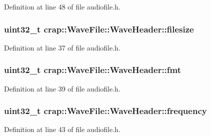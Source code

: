 Definition at line 48 of file audiofile.\+h.

\hypertarget{structcrap_1_1_wave_file_1_1_wave_header_a66ee60f117774b2a2c89b3b5b5d7881f}{}
\subsubsection[{filesize}]{\setlength{\rightskip}{0pt plus 5cm}uint32\+\_\+t crap\+::\+Wave\+File\+::\+Wave\+Header\+::filesize}\label{structcrap_1_1_wave_file_1_1_wave_header_a66ee60f117774b2a2c89b3b5b5d7881f}


Definition at line 37 of file audiofile.\+h.

\hypertarget{structcrap_1_1_wave_file_1_1_wave_header_a41722bd15601783d2587b233acb2e33b}{}
\subsubsection[{fmt}]{\setlength{\rightskip}{0pt plus 5cm}uint32\+\_\+t crap\+::\+Wave\+File\+::\+Wave\+Header\+::fmt}\label{structcrap_1_1_wave_file_1_1_wave_header_a41722bd15601783d2587b233acb2e33b}


Definition at line 39 of file audiofile.\+h.

\hypertarget{structcrap_1_1_wave_file_1_1_wave_header_ad069c28d60b7f89e6d2be429ad4b0347}{}
\subsubsection[{frequency}]{\setlength{\rightskip}{0pt plus 5cm}uint32\+\_\+t crap\+::\+Wave\+File\+::\+Wave\+Header\+::frequency}\label{structcrap_1_1_wave_file_1_1_wave_header_ad069c28d60b7f89e6d2be429ad4b0347}


Definition at line 43 of file audiofile.\+h.

\hypertarget{structcrap_1_1_wave_file_1_1_wave_header_a9b09473da66dc65a81f3af08246cc7b4}{}
